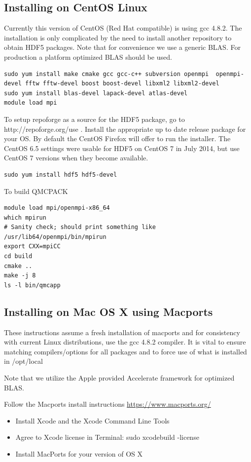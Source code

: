 \subsection{Installing on CentOS Linux}

Currently this version of CentOS (Red Hat compatible) is using gcc
4.8.2. The installation is only complicated by the need to install
another repository to obtain HDF5 packages. Note that for convenience
we use a generic BLAS. For production a platform optimized BLAS should
be used.

\begin{verbatim}
sudo yum install make cmake gcc gcc-c++ subversion openmpi  openmpi-devel fftw fftw-devel boost boost-devel libxml2 libxml2-devel
sudo yum install blas-devel lapack-devel atlas-devel
module load mpi 

\end{verbatim}

To setup repoforge as a source for the HDF5 package, go to http://repoforge.org/use . Install the appropriate up to date release package for your OS. By default the CentOS Firefox will offer to run the installer. The CentOS 6.5 settings were usable for HDF5 on CentOS 7 in July 2014, but use CentOS 7 versions when they become available.
\begin{verbatim}
sudo yum install hdf5 hdf5-devel 
\end{verbatim}

To build QMCPACK
\begin{verbatim}
module load mpi/openmpi-x86_64
which mpirun
# Sanity check; should print something like   /usr/lib64/openmpi/bin/mpirun
export CXX=mpiCC
cd build
cmake ..
make -j 8
ls -l bin/qmcapp
\end{verbatim}

\subsection{Installing on Mac OS X using Macports}
These instructions assume a fresh installation of macports
and for consistency with current Linux distributions, use the gcc 4.8.2
compiler. It is vital to ensure matching compilers/options for all
packages and to force use of what is installed in /opt/local

Note that we utilize the Apple provided Accelerate framework for optimized BLAS.

Follow the Macports install instructions \url{https://www.macports.org/}

\begin{itemize}
\item Install Xcode and the Xcode Command Line Tools
\item Agree to Xcode license in Terminal: sudo xcodebuild -license
\item Install MacPorts for your version of OS X
\end{itemize}



